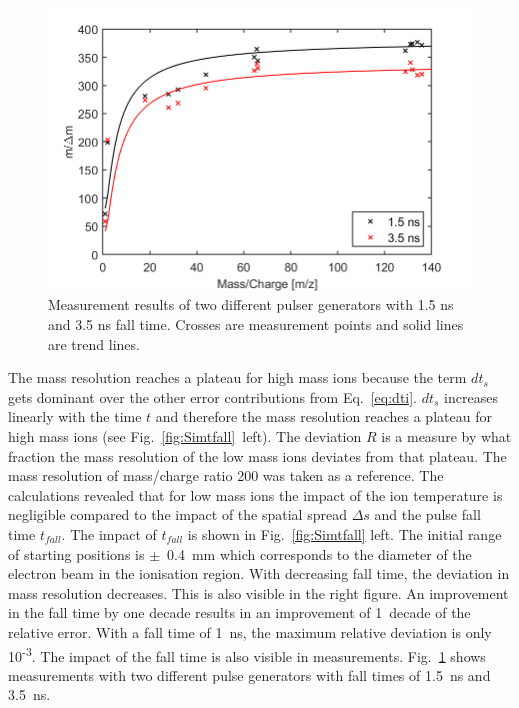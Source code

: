 	\begin{figure}[h!] %
		\centering
		\includegraphics[width=.8\textwidth]{Bilder/PulseLabWLEm480.png}
		\caption{Measurement results of two different pulser generators with 1.5 ns and 3.5 ns fall time. Crosses are measurement points and solid lines are trend lines.}
		\label{fig:LabWLE}
	\end{figure}
	The mass resolution reaches a plateau for high mass ions because the term $dt_s$ gets dominant over the other error contributions from Eq.~\eqref{eq:dti}. $dt_s$ increases linearly with the time $t$ and therefore the mass resolution reaches a plateau for high mass ions (see Fig.~\ref{fig:Simtfall}~left). The deviation $R$ is a measure by what fraction the mass resolution of the low mass ions deviates from that plateau. The mass resolution of mass/charge ratio 200 was taken as a reference.	The calculations revealed that for low mass ions the impact of the ion temperature is negligible compared to the impact of the spatial spread $\Delta s$ and the pulse fall time $t_{fall}$. The impact of $t_{fall}$ is shown in Fig.~\ref{fig:Simtfall} left. The initial range of starting positions is $\pm$~0.4~mm which corresponds to the diameter of the electron beam in the ionisation region. With decreasing fall time, the deviation in mass resolution decreases. This is also visible in the right figure. An improvement in the fall time by one decade results in an improvement of 1~decade of the relative error. With a fall time of 1~ns, the maximum relative deviation is only 10\textsuperscript{-3}. The impact of the fall time is also visible in measurements. Fig.~\ref{fig:LabWLE} shows measurements with two different pulse generators with fall times of 1.5~ns and 3.5~ns.\\

